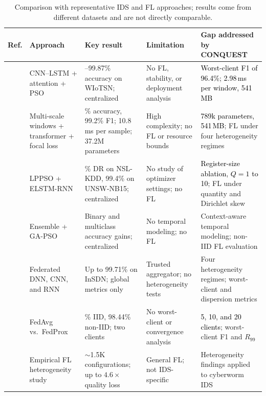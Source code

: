 \documentclass[conference]{IEEEtran}
\begin{document}
\begin{table}[!t]
\centering
\scriptsize
\caption{Comparison with representative IDS and FL approaches; results come from different datasets and are not directly comparable.}
\label{tab:comparative_analysis}
\def\rc#1{\textcolor{black}{#1}}
\setlength{\tabcolsep}{5pt}
\renewcommand{\arraystretch}{1.3}
\begin{tabular}{>{\raggedright\arraybackslash}p{1.0cm} >{\raggedright\arraybackslash}p{2.6cm} >{\raggedright\arraybackslash}p{4.0cm} >{\raggedright\arraybackslash}p{3.2cm} >{\raggedright\arraybackslash}p{4.4cm}}
\hline\toprule
\textbf{Ref.} & \textbf{Approach} & \textbf{Key result} & \textbf{Limitation} & \textbf{Gap addressed by CONQUEST} \\
\hline\toprule
\cite{phalaagaehybrid} & CNN--LSTM + attention + PSO & 98.73--99.87\% accuracy on WIoTSN; centralized & No FL, stability, or deployment analysis & \rc{Worst-client F1 of 96.4\%; 2.98\,ms per window, 541\,MB} \\
\midrule
\cite{yuadaptive} & Multi-scale windows + transformer + focal loss & 99.6\% accuracy, 99.2\% F1; 10.8\,ms per sample; 37.2M parameters & High complexity; no FL or resource bounds & \rc{789k parameters, 541\,MB}; FL under four heterogeneity regimes \\
\midrule
\cite{donkoloptimization} & LPPSO + ELSTM-RNN & 99.95\% DR on NSL-KDD, 99.4\% on UNSW-NB15; centralized & No study of optimizer settings; no FL & \rc{Register-size ablation, $Q=1$ to 10}; FL under quantity and Dirichlet skew \\
\midrule
\cite{shrivashybrid} & Ensemble + GA-PSO & Binary and multiclass accuracy gains; centralized & No temporal modeling; no FL & Context-aware temporal modeling; non-IID FL evaluation \\
\midrule
\cite{FRIHA202217} & Federated DNN, CNN, and RNN & Up to 99.71\% on InSDN; global metrics only & Trusted aggregator; no heterogeneity tests & Four heterogeneity regimes; worst-client and dispersion metrics \\
\midrule
\cite{herlambangfederated} & FedAvg vs.\ FedProx & 98.75\% IID, 98.44\% non-IID; two clients & No worst-client or convergence analysis & \rc{5, 10, and 20 clients}; worst-client F1 and $R_{99}$ \\
\midrule
\cite{abdelmoniemcomprehensive} & Empirical FL heterogeneity study & ${\sim}$1.5K configurations; up to $4.6\times$ quality loss & General FL; not IDS-specific & Heterogeneity findings applied to cyberworm IDS \\

\end{tabular}
\end{table}
\end{document}
